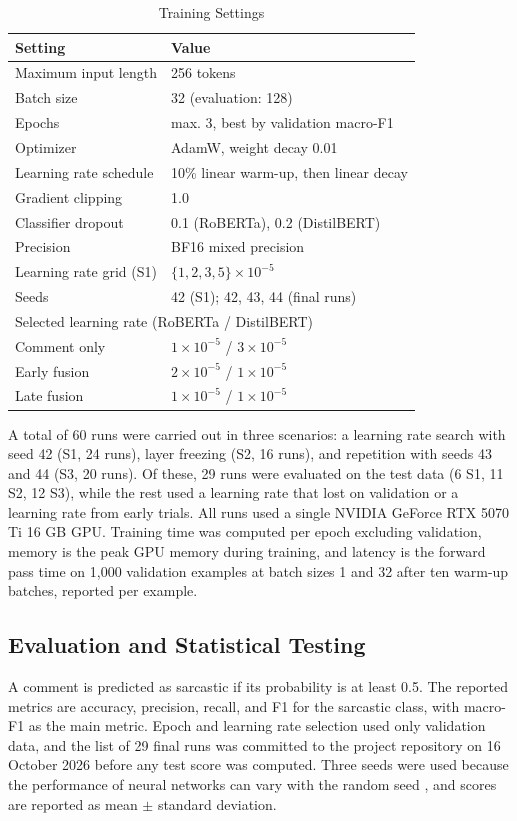 \documentclass[conference]{IEEEtran}
\begin{document}
\begin{table}[t]
\caption{Training Settings}
\label{tab:setup}
\centering
\begin{tabular}{ll}
\hline
Setting & Value \\
\hline
Maximum input length & 256 tokens \\
Batch size & 32 (evaluation: 128) \\
Epochs & max. 3, best by validation macro-F1 \\
Optimizer & AdamW, weight decay 0.01 \\
Learning rate schedule & 10\% linear warm-up, then linear decay \\
Gradient clipping & 1.0 \\
Classifier dropout & 0.1 (RoBERTa), 0.2 (DistilBERT) \\
Precision & BF16 mixed precision \\
Learning rate grid (S1) & $\{1, 2, 3, 5\} \times 10^{-5}$ \\
Seeds & 42 (S1); 42, 43, 44 (final runs) \\
\hline
\multicolumn{2}{l}{Selected learning rate (RoBERTa / DistilBERT)} \\
\quad Comment only & $1 \times 10^{-5}$ / $3 \times 10^{-5}$ \\
\quad Early fusion & $2 \times 10^{-5}$ / $1 \times 10^{-5}$ \\
\quad Late fusion & $1 \times 10^{-5}$ / $1 \times 10^{-5}$ \\
\hline
\end{tabular}
\end{table}

A total of 60 runs were carried out in three scenarios: a learning rate search with seed 42 (S1, 24 runs), layer freezing (S2, 16 runs), and repetition with seeds 43 and 44 (S3, 20 runs). Of these, 29 runs were evaluated on the test data (6 S1, 11 S2, 12 S3), while the rest used a learning rate that lost on validation or a learning rate from early trials. All runs used a single NVIDIA GeForce RTX 5070 Ti 16 GB GPU. Training time was computed per epoch excluding validation, memory is the peak GPU memory during training, and latency is the forward pass time on 1,000 validation examples at batch sizes 1 and 32 after ten warm-up batches, reported per example.

\subsection{Evaluation and Statistical Testing}
A comment is predicted as sarcastic if its probability is at least 0.5. The reported metrics are accuracy, precision, recall, and F1 for the sarcastic class, with macro-F1 as the main metric. Epoch and learning rate selection used only validation data, and the list of 29 final runs was committed to the project repository on 16 October 2026 before any test score was computed. Three seeds were used because the performance of neural networks can vary with the random seed \cite{ulmer2022deep}, and scores are reported as mean $\pm$ standard deviation.
\end{document}
